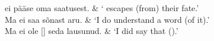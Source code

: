 	\twoFixedColumnsTable
	 ei pääse oma saatusest. 											& ` escapes (from) their fate.' \\
	Ma ei saa  sõnast aru.											& `I do  understand a  word (of it).' \\
	Ma ei ole  [] seda lausunud. 	& `I did  say that  ().'
	\tableEnd

\Text %

\Vocabulary %

\Exercises %

\Expressions %

\AnswersToExercises %

